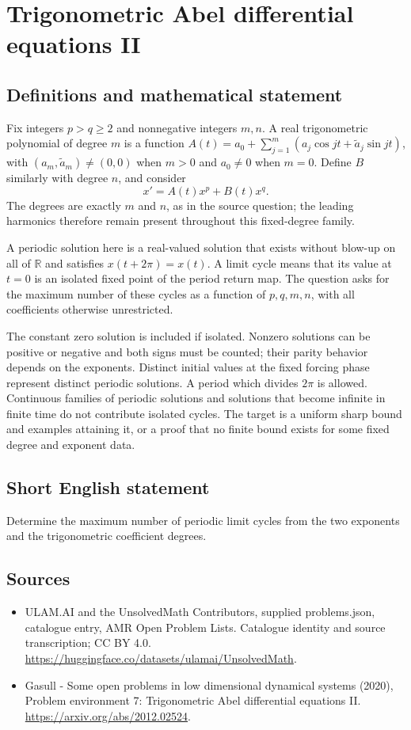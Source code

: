 \documentclass[11pt,a4paper]{article}
\begin{document}
\section*{Trigonometric Abel differential equations II}\label{statement}

\subsection{Definitions and mathematical statement}
Fix integers $p>q\ge2$ and nonnegative integers $m,n$. A real trigonometric
polynomial of degree $m$ is a function
$A(t)=a_0+\sum_{j=1}^m(a_j\cos jt+\widetilde a_j\sin jt)$,
with $(a_m,\widetilde a_m)\ne(0,0)$ when $m>0$ and $a_0\ne0$ when $m=0$.
Define $B$ similarly with degree $n$, and consider
\[
 x'=A(t)x^p+B(t)x^q.
\]
The degrees are exactly $m$ and $n$, as in the source question; the leading
harmonics therefore remain present throughout this fixed-degree family.

A periodic solution here is a real-valued solution that exists without
blow-up on all of $\mathbb R$ and satisfies $x(t+2\pi)=x(t)$. A limit cycle
means that its value at $t=0$ is an isolated fixed point of the period return
map. The question asks for the maximum number of these cycles as a function
of $p,q,m,n$, with all coefficients otherwise unrestricted.

The constant zero solution is included if isolated. Nonzero solutions can
be positive or negative and both signs must be counted; their parity
behavior depends on the exponents. Distinct initial values at the fixed
forcing phase represent distinct periodic solutions. A period which divides
$2\pi$ is allowed. Continuous families of periodic solutions and solutions
that become infinite in finite time do not contribute isolated cycles.
The target is a uniform sharp bound and examples attaining it, or a proof
that no finite bound exists for some fixed degree and exponent data.
\subsection{Short English statement}
Determine the maximum number of periodic limit cycles from the two exponents and the trigonometric coefficient degrees.
\subsection{Sources}
\begin{itemize}
\item[S1] ULAM.AI and the UnsolvedMath Contributors, supplied problems.json, catalogue entry, AMR Open Problem Lists. Catalogue identity and source transcription; CC BY 4.0.
\url{https://huggingface.co/datasets/ulamai/UnsolvedMath}.
\item[S2] Gasull - Some open problems in low dimensional dynamical systems (2020), Problem environment 7: Trigonometric Abel differential equations II. 
\url{https://arxiv.org/abs/2012.02524}.
\end{itemize}
\end{document}
